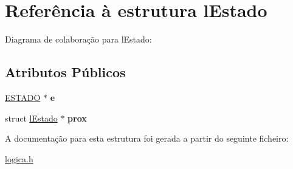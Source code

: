 \hypertarget{structlEstado}{}\section{Referência à estrutura l\+Estado}
\label{structlEstado}


Diagrama de colaboração para l\+Estado\+:
\subsection*{Atributos Públicos}
\begin{DoxyCompactItemize}
\item 
\mbox{\label{structlEstado_ae980e36d5fd31c6f37a065fc9c371b58}} 
\hyperlink{structESTADO}{E\+S\+T\+A\+DO} $\ast$ {\bfseries e}
\item 
\mbox{\label{structlEstado_a833521b1650b940a8b04ea2e20803850}} 
struct \hyperlink{structlEstado}{l\+Estado} $\ast$ {\bfseries prox}
\end{DoxyCompactItemize}


A documentação para esta estrutura foi gerada a partir do seguinte ficheiro\+:\begin{DoxyCompactItemize}
\item 
\hyperlink{logica_8h}{logica.\+h}\end{DoxyCompactItemize}
